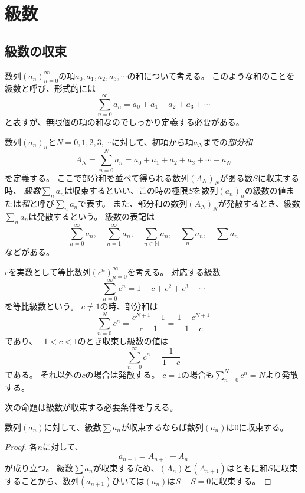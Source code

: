 
\chapter{級数}

\section{級数の収束}

数列$(a_n)_{n = 0}^\infty$の項$a_0, a_1, a_2, a_3, \cdots$の和について考える。
このような和のことを級数と呼び、形式的には
$$
\sum_{n = 0}^\infty a_n = a_0+a_1+a_2+a_3+\cdots
$$
と表すが、無限個の項の和なのでしっかり定義する必要がある。

\begin{definition}[級数]
数列$(a_n)_n$と$N = 0, 1, 2, 3, \cdots$に対して、初項から項$a_N$までの\emph{部分和}
$$
A_N = \sum_{n = 0}^N a_n = a_0+a_1+a_2+a_3+\cdots+a_N
$$
を定義する。
ここで部分和を並べて得られる数列$(A_N)_N$がある数$S$に収束する時、
\emph{級数}$\sum_n a_n$は収束するといい、この時の極限$S$を数列$(a_n)_n$の級数の値または\emph{和}と呼び$\sum_n a_n$で表す。
また、部分和の数列$(A_N)_N$が発散するとき、級数$\sum_n a_n$は発散するという。
級数の表記は
$$
\sum_{n = 0}^\infty a_n, \quad \sum_{n = 1}^\infty a_n, \quad \sum_{n \in \mathbb{N}}a_n, \quad \sum_n a_n, \quad \sum a_n
$$
などがある。
\end{definition}

\begin{example}
$c$を実数として等比数列$(c^n)_{n = 0}^\infty$を考える。
対応する級数
$$
\sum_{n = 0}^\infty c^n = 1+c+c^2+c^3+\cdots
$$
を等比級数という。
$c \ne 1$の時、部分和は
$$
\sum_{n = 0}^N c^n = \frac{c^{N+1}-1}{c-1} = \frac{1-c^{N+1}}{1-c}
$$
であり、$-1 < c < 1$のとき収束し級数の値は
$$
\sum_{n = 0}^\infty c^n = \frac{1}{1-c}
$$
である。
それ以外の$c$の場合は発散する。
$c = 1$の場合も$\sum_{n = 0}^N c^n = N$より発散する。
\end{example}

次の命題は級数が収束する必要条件を与える。

\begin{proposition}
数列$(a_n)$に対して、級数$\sum a_n$が収束するならば数列$(a_n)$は$0$に収束する。
\end{proposition}

\begin{proof}
各$n$に対して、
$$
a_{n+1} = A_{n+1}-A_n
$$
が成り立つ。
級数$\sum a_n$が収束するため、$(A_n)$と$(A_{n+1})$はともに和$S$に収束することから、数列$(a_{n+1})$ひいては$(a_n)$は$S-S = 0$に収束する。
\end{proof}

